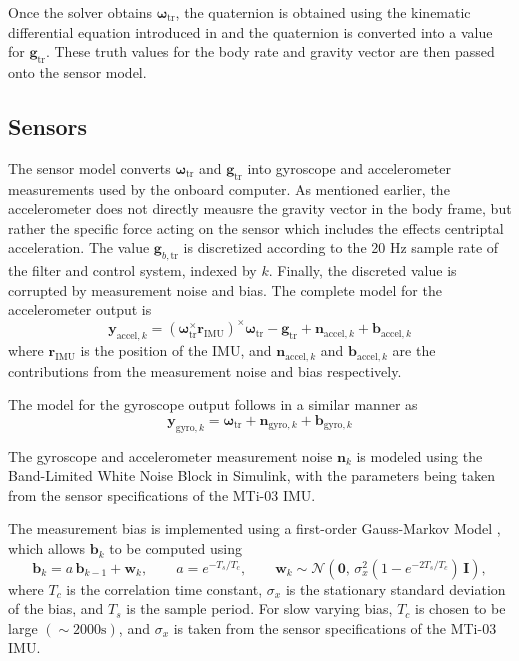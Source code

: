 Once the solver obtains $\bm{\omega}_\text{tr}$, the quaternion is obtained using the kinematic differential equation introduced in  and the quaternion is converted into a value for $\bm{g}_\text{tr}$. These truth values for the body rate and gravity vector are then passed onto the sensor model.

\subsection{Sensors}

The sensor model converts $\bm{\omega}_\text{tr}$ and $\bm{g}_{\text{tr}}$ into gyroscope and accelerometer measurements used by the onboard computer. As mentioned earlier, the accelerometer does not directly meausre the gravity vector in the body frame, but rather the specific force acting on the sensor which includes the effects centriptal acceleration. The value $\bm{g}_{b,\text{tr}}$ is discretized according to the 20 Hz sample rate of the filter and control system, indexed by $k$. Finally, the discreted value is corrupted by measurement noise and bias. The complete model for the accelerometer output is
\begin{equation}
    \bm{y}_{\text{accel},k}= (\bm{\omega}_{\text{tr}}^{\times}\bm{r}_\text{IMU})^{\times}\bm{\omega}_{\text{tr}}-\bm{g}_{\text{tr}} + \bm{n}_{\text{accel},k} + \bm{b}_{\text{accel},k}
\end{equation}
where $\bm{r}_\text{IMU}$ is the position of the IMU, and $\bm{n}_{\text{accel},k}$ and $\bm{b}_{\text{accel},k}$ are the contributions from the measurement noise and bias respectively.

The model for the gyroscope output follows in a similar manner as
\begin{equation}
    \bm{y}_{\text{gyro},k}= \bm{\omega}_{\text{tr}} + \bm{n}_{\text{gyro},k} + \bm{b}_{\text{gyro},k}
\end{equation}

The gyroscope and accelerometer measurement noise $\bm{n}_k$ is modeled using the Band-Limited White Noise Block in Simulink, with the parameters being taken from the sensor specifications of the MTi-03 IMU. 

The measurement bias is implemented using a first-order Gauss-Markov Model \cite{unsal_estimation_2012}, which allows $\bm{b}_k$ to be computed using
\begin{equation}
    \bm{b}_{k} = a\,\bm{b}_{k-1} + \bm{w}_k, \qquad
    a = e^{-T_s/T_c}, \qquad
    \bm{w}_k \sim \mathcal{N}\!\left(\bm{0},\,\sigma_x^2 (1-e^{-2T_s/T_c})\,\bm{I}\right),
\end{equation}
where $T_c$ is the correlation time constant, $\sigma_x$ is the stationary standard deviation of the bias, and $T_s$ is the sample period. For slow varying bias, $T_c$ is chosen to be large $(\sim2000\text{s})$, and $\sigma_x$ is taken from the sensor specifications of the MTi-03 IMU. 


